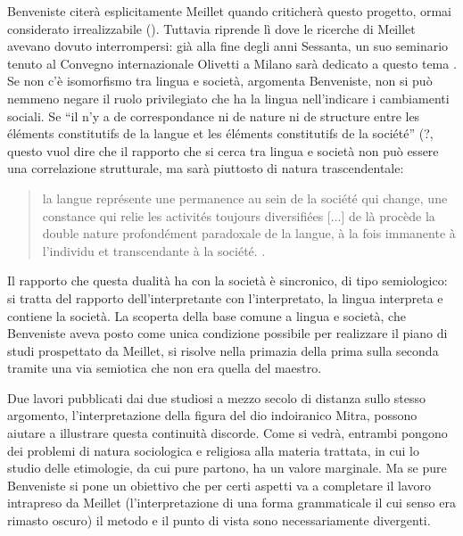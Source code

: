 \documentclass[output=paper]{langsci/langscibook}
\begin{document}
Benveniste citerà esplicitamente Meillet quando criticherà questo progetto, ormai considerato irrealizzabile (\citealt[14-15]{benveniste_problemes_1966}). Tuttavia riprende lì dove le ricerche di Meillet avevano dovuto interrompersi: già alla fine degli anni Sessanta, un suo seminario tenuto al Convegno internazionale Olivetti a Milano sarà dedicato a questo tema \citep{Benveniste1974}. Se non c’è isomorfismo tra lingua e società, argomenta Benveniste, non si può nemmeno negare il ruolo privilegiato che ha la lingua nell’indicare i cambiamenti sociali. Se “il n’y a de correspondance ni de nature ni de structure entre les éléments constitutifs de la langue et les éléments constitutifs de la société” (\citealt[93]{Benveniste1974}?, questo vuol dire che il rapporto che si cerca tra lingua e società non può essere una correlazione strutturale, ma sarà piuttosto di natura trascendentale:

\begin{quote}
    la langue représente une permanence au sein de la société qui change, une constance qui relie les activités toujours diversifiées [...] de là procède la double nature profondément paradoxale de la langue, à la fois immanente à l’individu et transcendante à la société. \citep[65]{Benveniste1974}.
\end{quote}

Il rapporto che questa dualità ha con la società è sincronico, di tipo semiologico: si tratta del rapporto dell’interpretante con l’interpretato, la lingua interpreta e contiene la società. La scoperta della base comune a lingua e società, che Benveniste aveva posto come unica condizione possibile per realizzare il piano di studi prospettato da Meillet, si risolve nella primazia della prima sulla seconda tramite una via semiotica che non era quella del maestro.\footnotemark{}

Due lavori pubblicati dai due studiosi a mezzo secolo di distanza sullo stesso argomento, l’interpretazione della figura del dio indoiranico Mitra, possono aiutare a illustrare questa continuità discorde. Come si vedrà, entrambi pongono dei problemi di natura sociologica e religiosa alla materia trattata, in cui lo studio delle etimologie, da cui pure partono, ha un valore marginale. Ma se pure Benveniste si pone un obiettivo che per certi aspetti va a completare il lavoro intrapreso da Meillet (l’interpretazione di una forma grammaticale il cui senso era rimasto oscuro) il metodo e il punto di vista sono necessariamente divergenti.
\end{document}
